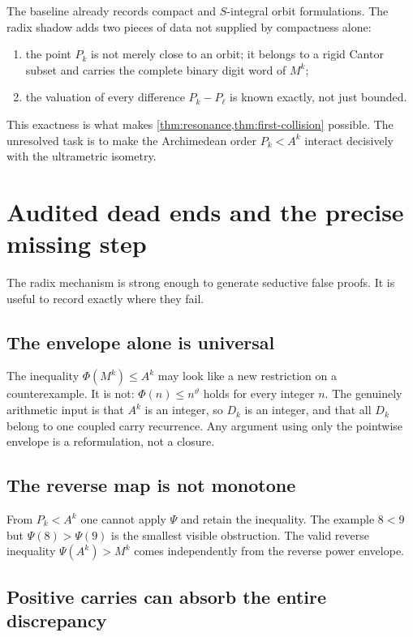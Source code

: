 \documentclass[11pt]{article}
\theoremstyle{definition}
\theoremstyle{remark}
\newcommand{\PhiMap}{\Phi}
\newcommand{\PsiMap}{\Psi}
\newcommand{\thetaAE}{\vartheta}
\begin{document}
The baseline already records compact and $S$-integral orbit formulations.
The radix shadow adds two pieces of data not supplied by compactness alone:

\begin{enumerate}
\item the point $P_k$ is not merely close to an orbit; it belongs to a rigid
Cantor subset and carries the complete binary digit word of $M^k$;
\item the valuation of every difference $P_k-P_\ell$ is known exactly, not
just bounded.
\end{enumerate}

This exactness is what makes \cref{thm:resonance,thm:first-collision}
possible.  The unresolved task is to make the Archimedean order
$P_k<A^k$ interact decisively with the ultrametric isometry.

\section{Audited dead ends and the precise missing step}\label{sec:why-not-closed}

The radix mechanism is strong enough to generate seductive false proofs.  It
is useful to record exactly where they fail.

\subsection{The envelope alone is universal}

The inequality $\PhiMap(M^k)\le A^k$ may look like a new restriction on a
counterexample.  It is not: $\PhiMap(n)\le n^{\thetaAE}$ holds for every
integer $n$.  The genuinely arithmetic input is that $A^k$ is an integer, so
$D_k$ is an integer, and that all $D_k$ belong to one coupled carry recurrence.
Any argument using only the pointwise envelope is a reformulation, not a
closure.

\subsection{The reverse map is not monotone}

From $P_k<A^k$ one cannot apply $\PsiMap$ and retain the inequality.  The
example $8<9$ but $\PsiMap(8)>\PsiMap(9)$ is the smallest visible obstruction.
The valid reverse inequality $\PsiMap(A^k)>M^k$ comes independently from the
reverse power envelope.

\subsection{Positive carries can absorb the entire discrepancy}
\end{document}

